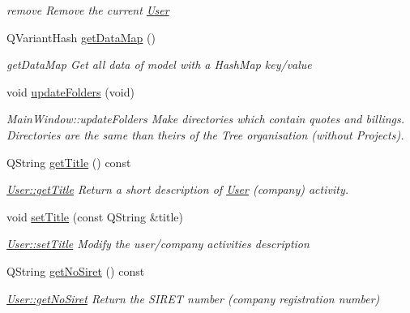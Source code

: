 \begin{DoxyCompactItemize}
\begin{DoxyCompactList}\small\item\em remove Remove the current \hyperlink{classModels_1_1User}{User} \end{DoxyCompactList}\item 
Q\-Variant\-Hash \hyperlink{classModels_1_1User_abbc8a3a40b527497872240bf39f21314}{get\-Data\-Map} ()
\begin{DoxyCompactList}\small\item\em get\-Data\-Map Get all data of model with a Hash\-Map key/value \end{DoxyCompactList}\item 
void \hyperlink{classModels_1_1User_ae61c862ac430d25b538601f343f7bf98}{update\-Folders} (void)
\begin{DoxyCompactList}\small\item\em Main\-Window\-::update\-Folders Make directories which contain quotes and billings. Directories are the same than theirs of the Tree organisation (without Projects). \end{DoxyCompactList}\item 
Q\-String \hyperlink{classModels_1_1User_a56a37a1b1125c28e8e72c9a3551b7da5}{get\-Title} () const 
\begin{DoxyCompactList}\small\item\em \hyperlink{classModels_1_1User_a56a37a1b1125c28e8e72c9a3551b7da5}{User\-::get\-Title} Return a short description of \hyperlink{classModels_1_1User}{User} (company) activity. \end{DoxyCompactList}\item 
void \hyperlink{classModels_1_1User_a0fe65ebdee17c2986c874e480e1cb0bd}{set\-Title} (const Q\-String \&title)
\begin{DoxyCompactList}\small\item\em \hyperlink{classModels_1_1User_a0fe65ebdee17c2986c874e480e1cb0bd}{User\-::set\-Title} Modify the user/company activities {\itshape description} \end{DoxyCompactList}\item 
Q\-String \hyperlink{classModels_1_1User_a617ee9ede3791842fbf8593f08660d37}{get\-No\-Siret} () const 
\begin{DoxyCompactList}\small\item\em \hyperlink{classModels_1_1User_a617ee9ede3791842fbf8593f08660d37}{User\-::get\-No\-Siret} Return the S\-I\-R\-E\-T number (company registration number) \end{DoxyCompactList}\item 

\end{DoxyCompactItemize}
